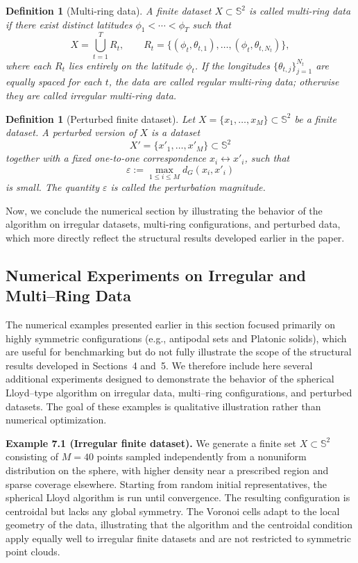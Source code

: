 \documentclass[12pt, reqno]{amsart}
\theoremstyle{plain}
\newtheorem{defi}[subsection]{Definition}
\theoremstyle{definition}
\newcommand{\D}[1]{\mathbb{#1}}%
\begin{document}
\begin{defi}[Multi-ring data]
A finite dataset $X\subset \D S^2$ is called \emph{multi-ring data} if there exist
distinct latitudes $\phi_1<\cdots<\phi_T$ such that
\[
X=\bigcup_{t=1}^T R_t,\qquad
R_t=\{(\phi_t,\theta_{t,1}),\dots,(\phi_t,\theta_{t,N_t})\},
\]
where each $R_t$ lies entirely on the latitude $\phi_t$.
If the longitudes $\{\theta_{t,j}\}_{j=1}^{N_t}$ are equally spaced for each $t$,
the data are called \emph{regular multi-ring data}; otherwise they are called
\emph{irregular multi-ring data}.
\end{defi}
\begin{defi}[Perturbed finite dataset]
Let $X=\{x_1,\dots,x_M\}\subset \D S^2$ be a finite dataset.
A \emph{perturbed version} of $X$ is a dataset
\[
X'=\{x'_1,\dots,x'_M\}\subset \D S^2
\]
together with a fixed one-to-one correspondence $x_i\leftrightarrow x'_i$,
such that
\[
\varepsilon:=\max_{1\le i\le M} d_G(x_i,x'_i)
\]
is small. The quantity $\varepsilon$ is called the \emph{perturbation magnitude}.
\end{defi}
\medskip  
Now, we conclude the numerical section by illustrating the behavior of the algorithm on
irregular datasets, multi-ring configurations, and perturbed data, which more directly
reflect the structural results developed earlier in the paper.
 
 
 \subsection{Numerical Experiments on Irregular and Multi--Ring Data}

The numerical examples presented earlier in this section focused primarily on highly
symmetric configurations (e.g., antipodal sets and Platonic solids), which are useful
for benchmarking but do not fully illustrate the scope of the structural results
developed in Sections~4 and~5.
We therefore include here several additional experiments designed to demonstrate the
behavior of the spherical Lloyd--type algorithm on irregular data, multi--ring
configurations, and perturbed datasets.
The goal of these examples is qualitative illustration rather than numerical
optimization.

\medskip
\noindent\textbf{Example 7.1 (Irregular finite dataset).}
We generate a finite set $X\subset \D S^2$ consisting of $M=40$ points sampled
independently from a nonuniform distribution on the sphere, with higher density near
a prescribed region and sparse coverage elsewhere.
Starting from random initial representatives, the spherical Lloyd algorithm is run
until convergence.
The resulting configuration is centroidal but lacks any global symmetry.
The Voronoi cells adapt to the local geometry of the data, illustrating that the
algorithm and the centroidal condition apply equally well to irregular finite
datasets and are not restricted to symmetric point clouds.
\end{document}
